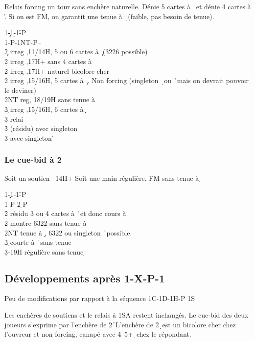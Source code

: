 \documentclass[a4paper]{article}
\begin{document}
Relais forcing un tour sans enchère naturelle. Dénie 5 cartes à \s\ et dénie 4 cartes à \h . 
Si on est FM, on garantit une tenue à \d\ (faible, pas besoin de tenue).

\begin{bidtable}
1\c-1\d-1\h-P\\
1\s-P-1NT-P--\\
2\c \> irreg ,11/14H, 5 ou 6 cartes à \c\ (3226 possible)\\
2\d \> irreg ,17H+ sans 4 cartes à \h \\
2\h \> irreg ,17H+ naturel bicolore cher\\
2\s \> irreg ,15/16H, 5 cartes à \c\ . Non forcing (singleton \d\ ou \h\ mais on devrait pouvoir le deviner)\\
2NT \> reg, 18/19H sans tenue à \d \\
3\c \> irreg ,15/16H, 6 cartes à \c \+\\
3\d \> relai\+\\
3\h \> (résidu) avec singleton \d \\
3\s \> avec singleton \h \-\-
\end{bidtable}

\subsubsection{Le cue-bid à 2 \pdfd}

Soit un soutien \s\ 14H+
Soit une main régulière, FM sans tenue à \d 

\begin{bidtable}
1\c-1\d-1\h-P\\
1\s-P-2\d-P--\\
2\h \> résidu 3 ou 4 cartes à \h\ et donc cours à \d \\
2\s \> montre 6322 sans tenue à \d \\
2NT \> tenue à \d , 6322 ou singleton \h\ possible.\\
3\c \> courte à \h\ sans tenue \d \\
3\d {}-19H régulière sans tenue \d 
\end{bidtable}

\subsection{Développements après 1\pdfh-X-P-1\pdfs}

Peu de modifications par rapport à la séquence
1C-1D-1H-P
1S

Les enchères de soutiens et le relais à 1SA restent inchangés.
Le cue-bid des deux joueurs s’exprime par l’enchère de 2\h\ 
L’enchère de 2\d\ est un bicolore cher chez l’ouvreur et non forcing, canapé avec 4\s\ 5+\d\ chez le 
répondant.
\end{document}
